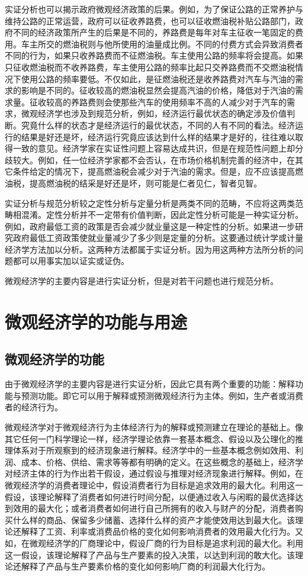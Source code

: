 实证分析也可以揭示政府微观经济政策的后果。例如，为了保证公路的正常养护与维持公路的正常运营，政府可以征收养路费，也可以征收燃油税补贴公路部门，政府不同的经济政策所产生的后果是不同的，养路费是每年对车主征收一笔固定的费用。车主所交的燃油税则与他所使用的油量成比例。不同的付费方式会异致消费者不同的行为，如果只收养路费而不征燃油税。车主使用公路的频率将会提高。如果只征收燃油税而不收养路费，车主使用公路的频率比起只交养路费而不交燃油税情况下使用公路的频率要低。不仅如此，是征燃油税还是收养路费对汽车与汽油的需求的影响是不同的。征收较高的燃油税显然会提高汽油的价格，降低对于汽油的需求量。征收较高的养路费则会使那些汽车的使用频率不高的人减少对于汽车的需求，微观经济学也涉及到规范分析，例如，经济运行最优状态的确定涉及价值判断。究竟什么样的状态才是经济运行的最优状态，不同的人有不同的看法。经济运行的结果是好还是坏，经济运行究竟应该达到什么样的结果才是好的，往往难以取得一致的意见。经济学家在实证性问题上容易达成共识，但是在规范性问题上却分歧较大。例如，任一位经济学家都不会否认，在市场价格机制完善的经济中，在其它条件给定的情况下，提高燃油税会减少对于汽油的需求。但是，应不应该提高燃油税，提高燃油税的结采是好还是坏，则可能是仁者见仁，智者见智。

实证分析与规范分析较之定性分析与定量分析是两类不同的范畴，不应将这两类范畴相混淆。定性分析并不一定带有价值判断，因此定性分析可能是一种实证分析。例如，政府最低工资的政策是否会减少就业量这是一种定性的分析。如果进一步研究政府最低工资政策使就业量减少了多少则是定量的分析。这要通过统计学或计量经济学方法加以分析。这两种方法都属于实证分析。因为用这两种方法所分析的问题都可以用事实加以证实或证伪。

微观经济学的主要内容是进行实证分析，但是对若干问题也进行规范分析。

\section{微观经济学的功能与用途}

\subsection{微观经济学的功能}

由于微观经济学的主要内容是进行实证分析，因此它具有两个重要的功能：解释功能与预测功能。即它可以用于解释或预测微观经济行为主体。例如，生产者或消费者的经济行为。

微观经济学对于微观经济行为主体经济行为的解释或预测建立在理论的基础上。像其它任何一门科学理论一样，经济学理论依靠一套基本概念、假设以及公理化的推理体系对于所观察到的经济现象进行解释。经济学中的一些基本概念例如效用、利润、成本、价格、供给、需求等等都有明确的定义。在这些概念的基础上，经济学对经济主体的行为作出若干假设，通过假设与推理对经济现象进行解释。例如，在微观经济学的消费者理论中，假设消费者行为目标是追求效用的最大化。利用这一假设，该理论解释了消费者如何进行时间分配，以便通过收入与闲暇的最优选择达到效用的最大化；或者消费者如何进行自己所拥有的收入与财产的分配，消费者购买什么样的商品、保留多少储蓄、选择什么样的资产才能使效用达到最大化。该理论还解释了工资、利率或消费品价格的变化如何影响消费者的效用最大化行为。又如，在微观经济学的厂商理论中，假设厂商的行为目标是追求利润的最大化。利用这一假设，该理论解释了产品与生产要素的投入决策，以达到利润的敢大化。该理论还解释了产品与生产要素价格的变化如何影响厂商的利润最大化行为。

